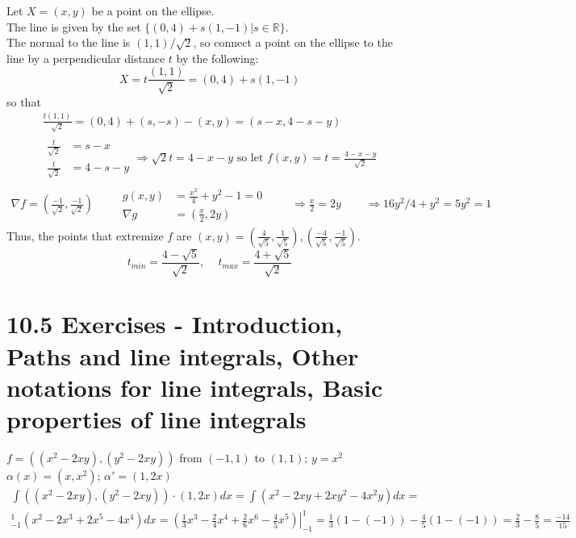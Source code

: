\documentclass[twoside]{amsart}
\theoremstyle{plain}
\theoremstyle{definition}
\newcommand{\exercisehead}[1]
  {
   \noindent{\small\bf Exercise #1.}
   \smallskip}
\begin{document}
\exercisehead{13} Let $X = (x,y)$ be a point on the ellipse.  \\
The line is given by the set $\{ (0,4) + s(1,-1) | s\in \mathbb{R} \}$.  \\
The normal to the line is $(1,1)/\sqrt{2}$, so connect a point on the ellipse to the line by a perpendicular distance $t$ by the following:
\[
X = t \frac{ (1,1)}{\sqrt{2} } = (0,4) + s(1,-1) 
\]
so that 
\[
\begin{gathered}
  \frac{ t (1,1) }{ \sqrt{2} } = (0,4) + (s,-s)  - (x,y) = (s-x, 4-s -y) \\ 
  \begin{aligned}
\frac{t}{\sqrt{2}} & = s -x \\ 
\frac{t}{\sqrt{2}} & = 4 - s - y \end{aligned} \Longrightarrow \sqrt{2} t = 4 - x -y \text{ so let } f(x,y) = t = \frac{4- x -y }{ \sqrt{2}} 
\end{gathered}
\]
\[
\begin{gathered}
  \nabla f = \left( \frac{-1}{\sqrt{2}}, \frac{-1}{\sqrt{2}} \right) \quad \quad \, \begin{aligned} g(x,y) & = \frac{x^2}{4} + y^2 - 1 = 0 \\ \nabla g & = \left( \frac{x}{2} , 2y \right) \end{aligned} \quad  \quad \, \Longrightarrow \frac{x}{2} = 2y \quad \quad \, 
  \Longrightarrow 16y^2/4 + y^2 = 5y^2 = 1 
\end{gathered}
\]
Thus, the points that extremize $f$ are $(x,y) = \left( \frac{4}{\sqrt{5}}, \frac{1}{\sqrt{5}} \right), \left( \frac{-4}{\sqrt{5}}, \frac{-1}{\sqrt{5}} \right)$.  
\[
\boxed{ t_{min} = \frac{ 4 - \sqrt{5}}{\sqrt{2}}, \quad \, t_{max} = \frac{ 4 + \sqrt{5}}{\sqrt{2}} }
\]

\section*{ 10.5 Exercises - Introduction, Paths and line integrals, Other notations for line integrals, Basic properties of line integrals }

\exercisehead{1} $f= ((x^2-2xy),(y^2 - 2xy))$ from $(-1,1)$ to $(1,1)$; \quad $y = x^2$ \smallskip \\
$\alpha(x) = (x,x^2)$; \quad $\alpha' = (1,2x)$
\[
\begin{gathered}
  \int ((x^2 - 2xy),(y^2 - 2xy))\cdot (1,2x) dx = \int (x^2 - 2xy + 2xy^2 - 4x^2 y ) dx = \\
_{-1}^1 (x^2  - 2x^3 + 2x^5 - 4x^4) dx = \left. \left( \frac{1}{3} x^3 - \frac{2}{4} x^4 + \frac{2}{6} x^6 - \frac{4}{5} x^5 \right) \right|_{-1}^1 = \frac{1}{3} (1-(-1)) - \frac{4}{5} (1-(-1)) = \frac{2}{3} - \frac{8}{5} = \boxed{ \frac{-14}{15} }
\end{gathered}
\]
\end{document}
